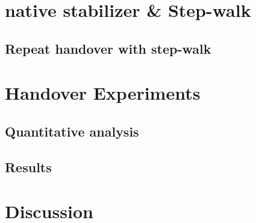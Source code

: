 \documentclass[a4paper, 12pt, oneside]{Thesis}  %
\begin{document}
\clearpage

\section{native stabilizer \& Step-walk}

\subsection{Repeat handover with step-walk}




\clearpage

\section{Handover Experiments}

\subsection{Quantitative analysis}

\subsection{Results}



\clearpage

\section{Discussion}







\end{document}
